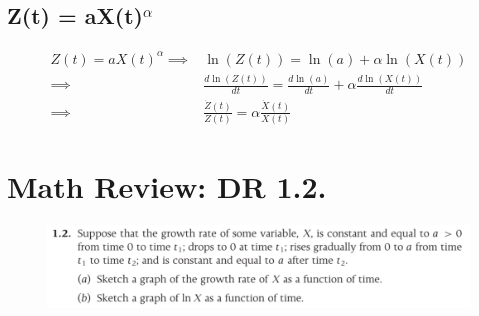 \documentclass{article}
\begin{document}
    
    \subsection{Z(t) = aX(t)$^\alpha$}
        
        \begin{align*}
            Z(t) = a X(t)^{\alpha}
            \implies&
            \ln(Z(t)) = \ln(a) + \alpha\ln(X(t))
            \\ \implies&
            \frac{ d \ln(Z(t)) }{ dt }
            = \frac{ d\ln(a) }{ dt } + \alpha \frac{ d\ln(X(t)) }{ dt }
            \\ \implies&
            \frac{ \dot{Z}(t) }{ Z(t) }
            = \alpha \frac{ \dot{X}(t) }{ X(t) }
        \end{align*}
    
    \section{Math Review: DR 1.2.}
        
        \begin{figure}[h!]
            \centering
            \includegraphics[width=\textwidth]{./HW1-DR1.2.png}
        \end{figure}


        
\end{document}

